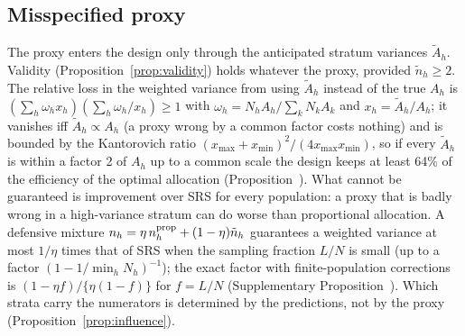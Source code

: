 \subsection{Misspecified proxy}\label{sec:theory-proxy}

The proxy enters the design only through the anticipated stratum variances $\tilde A_h$. Validity (Proposition~\ref{prop:validity}) holds whatever the proxy, provided $\tilde n_h\ge2$.
The relative loss in the weighted variance from using $\tilde A_h$ instead of the true $A_h$ is
$(\sum_h\omega_hx_h)(\sum_h\omega_h/x_h)\ge1$ with $\omega_h=N_hA_h/\sum_kN_kA_k$ and $x_h=\tilde A_h/A_h$; it vanishes iff $\tilde A_h\propto A_h$ (a proxy wrong by a common factor
costs nothing) and is bounded by the Kantorovich ratio $(x_{\max}+x_{\min})^2/(4x_{\max}x_{\min})$, so if every $\tilde A_h$ is within a factor 2 of $A_h$ up to a common scale the design keeps at least 64\% of the
efficiency of the optimal allocation (Proposition~). What cannot be guaranteed is improvement over SRS for every population: a proxy that is badly wrong in a high-variance stratum
can do worse than proportional allocation. A defensive mixture $n_h=\eta\,n^{\rm prop}_h+(1-\eta)\tilde n_h$ guarantees a weighted variance at most $1/\eta$ times that of SRS when the sampling fraction $L/N$ is small (up to a factor $(1-1/\min_hN_h)^{-1}$); the exact factor with finite-population corrections is $(1-\eta f)/\{\eta(1-f)\}$ for $f=L/N$ (Supplementary Proposition~). Which strata carry the numerators is determined
by the predictions, not by the proxy (Proposition~\ref{prop:influence}).
